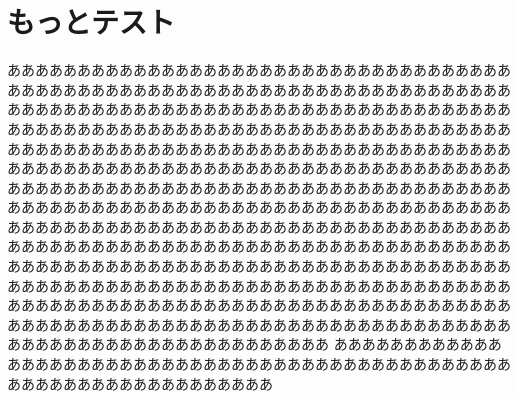 \documentclass{beamer}
\begin{document}
\section{もっとテスト}
\begin{frame}
あああああああああああああああああああああああああああああああああああああああああああああああああああああああああああああああああああああああああああああああああああああああああああああああああああああああああああああああああああああああああああああああああああああああああああああああああああああああああああああああああああああああああああああああああああああああああああああああああああああああああああああああああああああああああああああああああああああああああああああああああああああああああああああああああああああああああああああああああああああああああああああああああああああああああああああああああああああああああああああああああああああああああああああああああああああああああああああああああああああああああああああああああああああああああああああああああああああああああああああああああああああああああああああああああああああああああああああああああああああああああああああああああああああああああああああああああああああああああああああああああああああああああああああああああああああああああああああああああああああああああああああああ
あああああああああああああああああああああああああああああああああああああああああああああああああああああああああああああああああああ
\end{frame}
\end{document}
